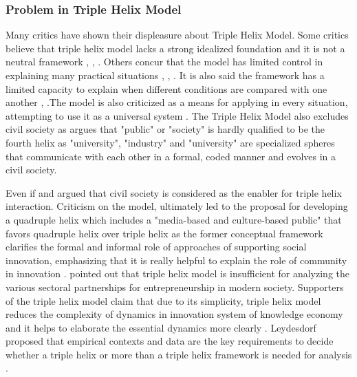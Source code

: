 \documentclass[CHICAGO,Times1COL]{WileyNJDv5} %
\begin{document}
\subsubsection{Problem in Triple Helix Model}
Many critics have shown their displeasure about Triple Helix Model. Some critics believe that triple helix model lacks a strong idealized foundation and it is not a neutral framework \citet{COOKE20051128}, \citet{doi:10.1177/0306312702032004004}, \citet{doi:10.1177/0896920510365923}. Others concur that the model has limited control in explaining many practical situations \citet{5a8325d5987d4e6cbbe13505ce9e8deb}, \citet{GIULIANI2009906}, \citet{Tuunainen_2002}. It is also said the framework has a limited capacity to explain when different conditions are compared with one another \cite {cai2014implementing}, \citet{10.1093/oxfordhb/9780199286805.003.0008}.The model is also criticized as a means for applying in every situation, attempting to use it as a universal system \citet{b43a59f55f5e439e81a135cd5d476623}. The Triple Helix Model also excludes civil society as \citet{leydesdorff2003can}  argues that "public" or "society" is hardly qualified to be the fourth helix as "university", "industry" and "university" are specialized spheres that communicate with each other in a formal, coded manner and evolves in a civil society. 

Even if \citet{henry2008triple} and \citet{etzkowitz2017triple} argued that civil society is considered as the enabler for triple helix interaction. Criticism on the model, ultimately led to the proposal for developing a quadruple helix which includes a "media-based and culture-based public" \citet{doi:10.1504/IJTM.2009.023374, NORDBERG2020157} that favors quadruple helix over triple helix as the former conceptual framework clarifies the formal and informal role of approaches of supporting social innovation, emphasizing that it is really helpful to explain the role of community in innovation .  \cite{doi:10.1080/03075079.2020.1823647} pointed out that triple helix model is insufficient for analyzing the various sectoral partnerships for entrepreneurship in modern society. Supporters of the triple helix model claim that due to its simplicity, triple helix model reduces the complexity of dynamics in innovation system of knowledge economy and it helps to elaborate the essential dynamics more clearly \cite{zheng2010second}. Leydesdorf proposed that empirical contexts and data are the key requirements to decide whether a triple helix or more than a triple helix framework is needed for analysis \citet{leydesdorff2012triple}.  
\end{document}
